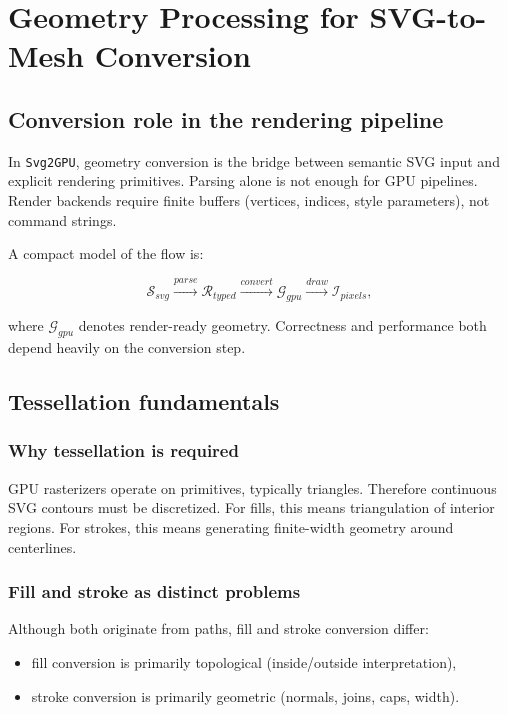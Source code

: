 \chapter{Geometry Processing for SVG-to-Mesh Conversion}
\label{chap:geometry_conversion}

\section{Conversion role in the rendering pipeline}

In \texttt{Svg2GPU}, geometry conversion is the bridge between semantic SVG input and explicit rendering primitives.
Parsing alone is not enough for GPU pipelines.
Render backends require finite buffers (vertices, indices, style parameters), not command strings.

A compact model of the flow is:

\begin{equation}
\mathcal{S}_{svg} \xrightarrow{parse} \mathcal{R}_{typed} \xrightarrow{convert} \mathcal{G}_{gpu} \xrightarrow{draw} \mathcal{I}_{pixels},
\label{eq:conversion_pipeline}
\end{equation}

where $\mathcal{G}_{gpu}$ denotes render-ready geometry.
Correctness and performance both depend heavily on the conversion step.

\section{Tessellation fundamentals}

\subsection{Why tessellation is required}

GPU rasterizers operate on primitives, typically triangles.
Therefore continuous SVG contours must be discretized.
For fills, this means triangulation of interior regions.
For strokes, this means generating finite-width geometry around centerlines.

\subsection{Fill and stroke as distinct problems}

Although both originate from paths, fill and stroke conversion differ:

\begin{itemize}
\item fill conversion is primarily topological (inside/outside interpretation),
\item stroke conversion is primarily geometric (normals, joins, caps, width).
\end{itemize}

